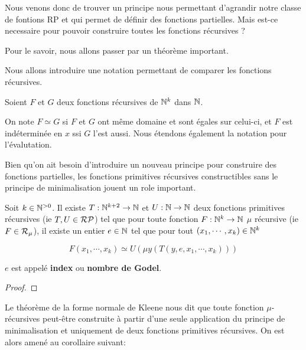 Nous venons donc de trouver un principe nous permettant d'agrandir notre classe
de fontions RP et qui permet de définir des fonctions partielles. Mais est-ce
necessaire pour pouvoir construire toutes les fonctions récursives ?

Pour le savoir, nous allons passer par un théorème important.

Nous allons introduire une notation permettant de comparer les fonctions
récursives.

\begin{definition} 
	Soient $F$ et $G$ deux fonctions récursives de $\mathbb{N}^{k}$
	dans $\mathbb{N}$.

	On note $F \simeq G$ si $F$ et $G$ ont même domaine et
	sont égales sur celui-ci, et $F$ est indéterminée en $x$ ssi $G$ l'est
	aussi. Nous étendons également la notation pour l'évalutation.
\end{definition}

Bien qu'on ait besoin d'introduire un nouveau principe pour construire des
fonctions partielles, les fonctions primitives récursives constructibles sans le
principe de minimalisation jouent un role important.

\begin{theorem} 
	\label{theorem:kleene_normal_form}
	Soit $k \in \mathbb{N}^{> 0}$.
	Il existe $T : \mathbb{N}^{k + 2} \rightarrow \mathbb{N}$ et
	$U : \mathbb{N} \rightarrow \mathbb{N}$ deux fonctions primitives récursives
	(ie $T, U \in \mathcal{RP}$) tel que pour toute fonction
	$F : \mathbb{N}^{k} \rightarrow \mathbb{N}$ $\mu$ récursive (ie $F \in
	\mathcal{R}_{\mu}$), il existe un entier $e \in \mathbb{N}$ tel que pour
	tout $(x_{1}, \cdots, x_{k}) \in \mathbb{N}^{k}$

	\begin{equation*}
		F(x_{1}, \cdots, x_{k}) \simeq U(\mu y (T(y, e, x_{1}, \cdots, x_{k})))
	\end{equation*}

	$e$ est appelé \textbf{index} ou \textbf{nombre de Godel}.
\end{theorem}

\ifdefined\outputproof
\begin{proof}

\end{proof}
\fi

Le théorème de la forme normale de Kleene nous dit que toute fonction
$\mu$-récursives peut-être construite à partir d'une seule application du
principe de minimalisation et uniquement de deux fonctions primitives
récursives. On est alors amené au corollaire suivant:

